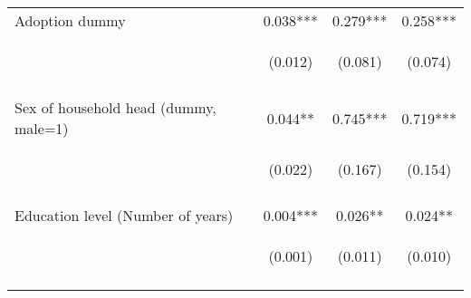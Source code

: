 \begin{center}
\begin{tabular}{lccc}
Adoption dummy & 0.038*** & 0.279*** & 0.258*** \\
 & \begin{footnotesize}(0.012)\end{footnotesize} & \begin{footnotesize}(0.081)\end{footnotesize} & \begin{footnotesize}(0.074)\end{footnotesize} \\
\vspace{4pt} & \begin{footnotesize}[0.001]\end{footnotesize} & \begin{footnotesize}[0.001]\end{footnotesize} & \begin{footnotesize}[0.001]\end{footnotesize} \\
Sex of household head (dummy, male=1) & 0.044** & 0.745*** & 0.719*** \\
 & \begin{footnotesize}(0.022)\end{footnotesize} & \begin{footnotesize}(0.167)\end{footnotesize} & \begin{footnotesize}(0.154)\end{footnotesize} \\
\vspace{4pt} & \begin{footnotesize}[0.047]\end{footnotesize} & \begin{footnotesize}[0.000]\end{footnotesize} & \begin{footnotesize}[0.000]\end{footnotesize} \\
Education level (Number of years) & 0.004*** & 0.026** & 0.024** \\
 & \begin{footnotesize}(0.001)\end{footnotesize} & \begin{footnotesize}(0.011)\end{footnotesize} & \begin{footnotesize}(0.010)\end{footnotesize} \\
\vspace{4pt} & \begin{footnotesize}[0.005]\end{footnotesize} & \begin{footnotesize}[0.013]\end{footnotesize} & \begin{footnotesize}[0.014]\end{footnotesize} \\

\end{tabular}
\end{center}
